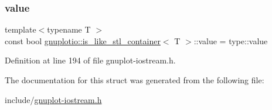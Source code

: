 \subsubsection{\texorpdfstring{value}{value}}
{\footnotesize\ttfamily template$<$typename T $>$ \\
const bool \hyperlink{structgnuplotio_1_1is__like__stl__container}{gnuplotio\+::is\+\_\+like\+\_\+stl\+\_\+container}$<$ T $>$\+::value = type\+::value\hspace{0.3cm}{\ttfamily [static]}}



Definition at line 194 of file gnuplot-\/iostream.\+h.



The documentation for this struct was generated from the following file\+:\begin{DoxyCompactItemize}
\item 
include/\hyperlink{gnuplot-iostream_8h}{gnuplot-\/iostream.\+h}\end{DoxyCompactItemize}

